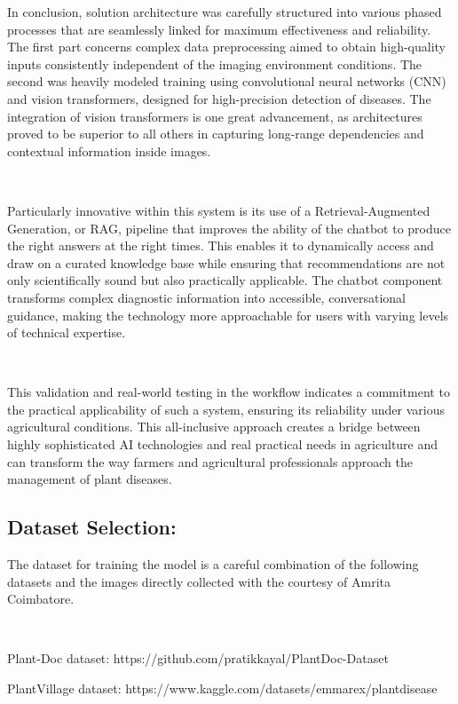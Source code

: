 In conclusion, solution architecture was carefully structured into various phased processes that are seamlessly linked for maximum effectiveness and reliability. The first part concerns complex data preprocessing aimed to obtain high-quality inputs consistently independent of the imaging environment conditions. The second was heavily modeled training using convolutional neural networks (CNN) and vision transformers, designed for high-precision detection of diseases. The integration of vision transformers is one great advancement, as architectures proved to be superior to all others in capturing long-range dependencies and contextual information inside images.

\

Particularly innovative within this system is its use of a Retrieval-Augmented Generation, or RAG, pipeline that improves the ability of the chatbot to produce the right answers at the right times. This enables it to dynamically access and draw on a curated knowledge base while ensuring that recommendations are not only scientifically sound but also practically applicable. The chatbot component transforms complex diagnostic information into accessible, conversational guidance, making the technology more approachable for users with varying levels of technical expertise.

\

This validation and real-world testing in the workflow indicates a commitment to the practical applicability of such a system, ensuring its reliability under various agricultural conditions. This all-inclusive approach creates a bridge between highly sophisticated AI technologies and real practical needs in agriculture and can transform the way farmers and agricultural professionals approach the management of plant diseases.

\subsection{Dataset Selection:}

The dataset for training the model is a careful combination of the following datasets and the images directly collected with the courtesy of Amrita Coimbatore.

\

Plant-Doc dataset: https://github.com/pratikkayal/PlantDoc-Dataset 

PlantVillage dataset: https://www.kaggle.com/datasets/emmarex/plantdisease

